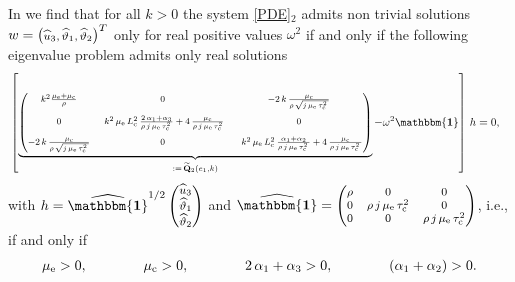 \documentclass[10pt]{article}
\newcommand{\id}{{\mathbf{\mathbbm{1}}}}
\begin{document}
In \cite{khan2022existence} we find that  for all $k>0$  the system \eqref{PDE}$_2$
admits non trivial solutions $w=\begin{footnotesize}\begin{pmatrix}
\widehat{u}_3,\widehat{ \vartheta }_1,\widehat{ \vartheta }_2
\end{pmatrix}\end{footnotesize}^T$  only for  real positive values $\omega^2$  if and only if the following eigenvalue problem admits only real solutions
\begin{align}
&\left[\underbrace{\begin{footnotesize}\begin{pmatrix}
	k^2\frac{ \mu_{\rm e} +\mu_{\rm c} }{\rho}& 0& -2\, k\, \frac{\mu_{\rm c}}{\rho\, \sqrt{j\,\mu_{\rm e}\,\tau_{\rm c}^2\,}}\vspace{2mm}\\
	0& \ k^2\, {\mu_{\rm e}\,L_{\rm c}^2}\,\frac{2\,\alpha_1 +\alpha_3}{\rho\, j\,\mu_{\rm e}\,\tau_{\rm c}^2\,}+4\, \frac{\mu_{\rm c}}{\rho \, j\,\mu_{\rm e}\,\tau_{\rm c}^2}& 0\vspace{2mm}\\
	-2\, k\, \frac{\mu_{\rm c}}{\rho\, \sqrt{j\,\mu_{\rm e}\,\tau_{\rm c}^2\,}}& 0&\ \ k^2\, {\mu_{\rm e}\,L_{\rm c}^2}\,\frac{\alpha_1 +\alpha_2}{\rho\, j\,\mu_{\rm e}\,\tau_{\rm c}^2\,}+4\, \frac{\mu_{\rm c}}{\rho \, j\,\mu_{\rm e}\,\tau_{\rm c}^2\,}
	\end{pmatrix}\end{footnotesize}}_{:=\,\widetilde{\mathbf{Q}}_2(e_1,k)}-\omega^2\id\right]\, h=0, 
\end{align}
with $h=\widehat{\id}^{1/2}\begin{footnotesize}\begin{pmatrix}
\widehat{u}_3\\\widehat{ \vartheta }_1\\\widehat{ \vartheta }_2
\end{pmatrix}\end{footnotesize}$ and	$\widehat{\id} =\begin{footnotesize}\begin{pmatrix} \rho&0	&0
\\
0&\rho\,j\,\mu_{\rm e}\,\tau_{\rm c}^2
&0
\\0
& 0 & \rho\,j\,\mu_{\rm e}\,\tau_{\rm c}^2\end{pmatrix}\end{footnotesize}$, i.e., if and only if 
\begin{align}\label{rw3}
\mu_{\rm e}>0, \qquad\qquad  \mu_{\rm c}>0,  \qquad\qquad 2\, \alpha _1+\alpha _3 >0, \qquad\qquad (\alpha _1+\alpha _2) >0.
\end{align}
\end{document}

